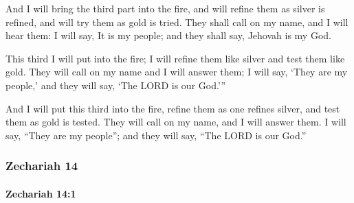 			\begin{versebox}
					\item[BHS] 
					\item[LXX] 
					\item[ASV] And I will bring the third part into the fire, and will refine them as silver is refined, and will try them as gold is tried. They shall call on my name, and I will hear them: I will say, It is my people; and they shall say, Jehovah is my God.
					\item[NIV] This third I will put into the fire; I will refine them like silver and test them like gold. They will call on my name and I will answer them; I will say, ‘They are my people,’ and they will say, ‘The LORD is our God.’”
					\item[NRSV] And I will put this third into the fire, refine them as one refines silver, and test them as gold is tested. They will call on my name, and I will answer them. I will say, “They are my people”; and they will say, “The LORD is our God.”
			\end{versebox}
	\subsubsection{Zechariah 14} %
		\label{ZECHARIAH-14}

		\paragraph{Zechariah 14:1} %
			\label{ZECHARIAH-14-1}


